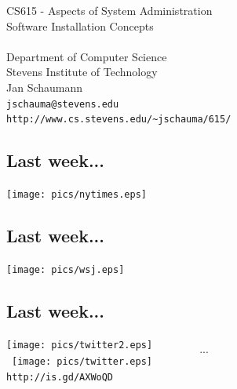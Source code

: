 \documentclass[xga]{xdvislides}
\begin{document}
\setfontphv

\lhead{\slidetitle}                               %
\cfoot{\relax}                               %
\rfoot{\Gray{\today}}

\vspace*{\fill}
\begin{center}
	\Hugesize
		CS615 - Aspects of System Administration\\ [1em]
		Software Installation Concepts \\ [1em]
	\hspace*{5mm}\blueline\\ [1em]
	\Normalsize
		Department of Computer Science\\
		Stevens Institute of Technology\\
		Jan Schaumann\\
		\verb+jschauma@stevens.edu+ \\
		\verb+http://www.cs.stevens.edu/~jschauma/615/+
\end{center}
\vspace*{\fill}

\subsection{Last week...}
\begin{center}
	\texttt{[image: pics/nytimes.eps]}
\end{center}

\subsection{Last week...}
\begin{center}
	\texttt{[image: pics/wsj.eps]} \\
\end{center}

\subsection{Last week...}
\begin{center}
	\texttt{[image: pics/twitter2.eps]} \\
	\[...\] \
	\texttt{[image: pics/twitter.eps]} \\
	\vspace{.5in}
	\small
	{\tt http://is.gd/AXWoQD}
	\Normalsize
\end{center}
\end{document}
